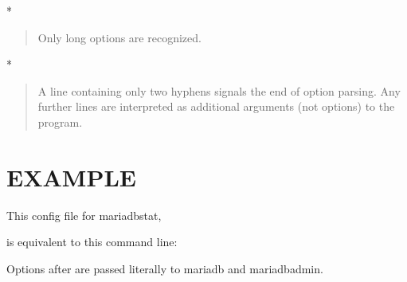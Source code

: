 \documentclass[letterpaper,10pt,english]{sphinxmanual}
\begin{document}
*
\begin{quote}

Only long options are recognized.
\end{quote}

*
\begin{quote}

A line containing only two hyphens signals the end of option parsing.  Any
further lines are interpreted as additional arguments (not options) to the
program.
\end{quote}


\section{EXAMPLE}
\label{\detokenize{configuration_files:example}}
This config file for mariadb\sphinxhyphen{}stat,

\begin{sphinxVerbatim}[commandchars=\\\{\}]
  
 
\end{sphinxVerbatim}

is equivalent to this command line:

\begin{sphinxVerbatim}[commandchars=\\\{\}]
       
\end{sphinxVerbatim}

Options after \sphinxcode{\sphinxupquote{\sphinxhyphen{}\sphinxhyphen{}}} are passed literally to mariadb and mariadb\sphinxhyphen{}admin.
\end{document}
